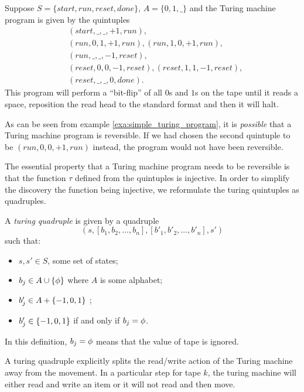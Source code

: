 \begin{example}\label{exa:simple_turing_program}
  Suppose $S=\{start,run,reset,done\}$, $A=\{0,1,\_\}$ and the Turing machine
  program is given by the quintuples
  \begin{align*}
    &(start,\_,\_,+1,run),\\
    &(run,0,1,+1,run), (run,1,0,+1,run),\\
    &(run,\_,\_,-1,reset),\\
    &(reset,0,0,-1,reset),(reset,1,1,-1,reset),\\
    &(reset,\_,\_,0,done).
  \end{align*}
  This program will perform a ``bit-flip'' of all $0$s and $1$s on the tape
  until it reads a space, reposition the read head to the standard format
  and then it will halt.
\end{example}

As can be seen from example \vref{exa:simple_turing_program}, it is \emph{possible}
that a Turing machine program is reversible. If we had chosen the second
quintuple to be $(run,0,0,+1,run)$ instead, the program would not have been
reversible.

The essential property that a Turing machine program needs to be reversible
is that the function $\tau$ defined from the quintuples is injective. In order
to simplify the discovery the function being injective, we reformulate the
turing quintuples as quadruples.

\begin{definition}\label{def:turing_quadruple}
  A \emph{turing quadruple} is given by a quadruple
  \[(s,[b_1,b_2,\ldots,b_n],[b'_1,b'_2,\ldots,b'_n],s')\]
  such that:
  \begin{itemize}
    \item $s,s'\in S$, some set of states;
    \item $b_j\in A  \cup \{\phi\}$ where $A$ is some alphabet;
    \item $b'_j\in A  + \{-1,0,1\}$ ;
    \item $b'_j \in \{-1,0,1\}$ if and only if $b_j = \phi$.
  \end{itemize}
  In this definition, $b_j = \phi$ means that the value of tape
  \jay is ignored.
\end{definition}

A turing quadruple explicitly splits the read/write action of the
Turing machine away from the movement. In a particular step for
tape $k$, the
turing machine will either read and write an item or it will not
read and then move.


